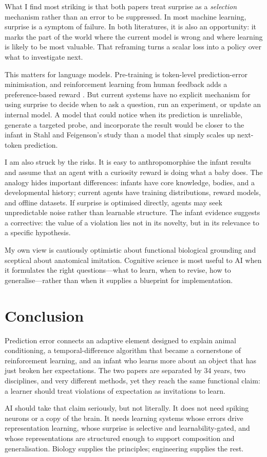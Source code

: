 \documentclass{article}
\begin{document}
What I find most striking is that both papers treat surprise as a \emph{selection}
mechanism rather than an error to be suppressed. In most machine learning, surprise is a
symptom of failure. In both literatures, it is also an opportunity: it marks the part of
the world where the current model is wrong and where learning is likely to be most
valuable. That reframing turns a scalar loss into a policy over what to investigate next.

This matters for language models. Pre-training is token-level prediction-error
minimisation, and reinforcement learning from human feedback adds a preference-based
reward \citep{ouyang2022training}. But current systems have no explicit mechanism for using
surprise to decide when to ask a question, run an experiment, or update an internal model.
A model that could notice when its prediction is unreliable, generate a targeted probe,
and incorporate the result would be closer to the infant in Stahl and Feigenson's study
than a model that simply scales up next-token prediction.

I am also struck by the risks. It is easy to anthropomorphise the infant results and assume
that an agent with a curiosity reward is doing what a baby does. The analogy hides
important differences: infants have core knowledge, bodies, and a developmental history;
current agents have training distributions, reward models, and offline datasets. If
surprise is optimised directly, agents may seek unpredictable noise rather than learnable
structure. The infant evidence suggests a corrective: the value of a violation lies not in
its novelty, but in its relevance to a specific hypothesis.

My own view is cautiously optimistic about functional biological grounding and sceptical
about anatomical imitation. Cognitive science is most useful to AI when it formulates the
right questions---what to learn, when to revise, how to generalise---rather than when it
supplies a blueprint for implementation.

\section{Conclusion}\label{sec:conclusion}

Prediction error connects an adaptive element designed to explain animal conditioning, a
temporal-difference algorithm that became a cornerstone of reinforcement learning, and an
infant who learns more about an object that has just broken her expectations. The two
papers are separated by 34 years, two disciplines, and very different methods, yet they
reach the same functional claim: a learner should treat violations of expectation as
invitations to learn.

AI should take that claim seriously, but not literally. It does not need spiking neurons or
a copy of the brain. It needs learning systems whose errors drive representation learning,
whose surprise is selective and learnability-gated, and whose representations are
structured enough to support composition and generalisation. Biology supplies the
principles; engineering supplies the rest.



\end{document}
